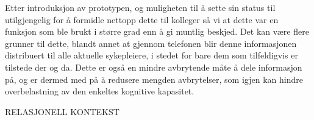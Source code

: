 \noindent
Etter introduksjon av prototypen, og muligheten til å sette sin status til utilgjengelig
for å formidle nettopp dette til kolleger så vi at dette var en funksjon som ble brukt
i større grad enn å gi muntlig beskjed. Det kan være flere grunner til dette, blandt annet at gjennom telefonen blir denne informasjonen distribuert til alle aktuelle sykepleiere, i stedet for bare dem som tilfeldigvis er tilstede der og da. Dette er også en mindre avbrytende måte å dele informasjon på, og er dermed med på å redusere mengden avbrytelser, som igjen kan hindre overbelastning av den enkeltes kognitive kapasitet. 


\noindent


RELASJONELL KONTEKST